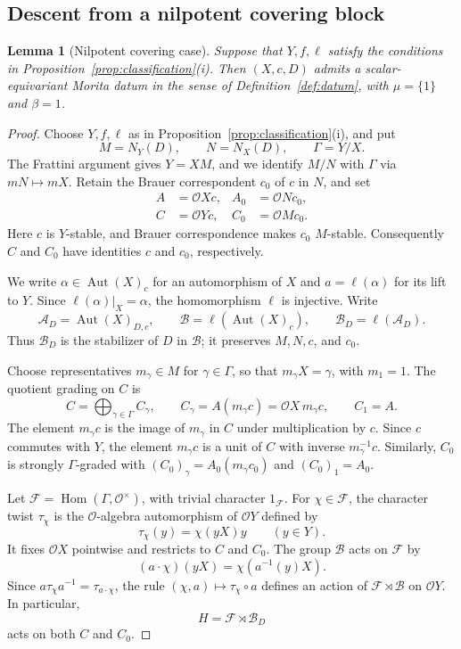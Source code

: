 \documentclass[11pt,a4paper]{article}
\newtheorem{lemma}[theorem]{Lemma}
\theoremstyle{definition}
\theoremstyle{remark}
\numberwithin{equation}{section}
\newcommand{\cO}{\mathcal{O}}
\DeclareMathOperator{\Aut}{Aut}
\DeclareMathOperator{\Hom}{Hom}
\begin{document}
	\subsection{Descent from a nilpotent covering block}
	
	\begin{lemma}[Nilpotent covering case]\label{lem:nilpotent-covering}
		Suppose that $Y,f,\ell$ satisfy the conditions in
		Proposition~\ref{prop:classification}\textup{(i)}.
		Then $(X,c,D)$ admits a scalar-equivariant Morita datum in the
		sense of Definition~\ref{def:datum}, with $\mu=\{1\}$ and $\beta=1$.
	\end{lemma}
	
	\begin{proof}
		Choose $Y,f,\ell$ as in Proposition~\ref{prop:classification}\textup{(i)},
		and put
		\[
		M=N_Y(D),\qquad N=N_X(D),\qquad \Gamma=Y/X.
		\]
		The Frattini argument gives $Y=XM$, and we identify $M/N$ with
		$\Gamma$ via $mN\mapsto mX$. Retain the Brauer correspondent
		$c_0$ of $c$ in $N$, and set
		\[
		\begin{aligned}
			A&=\cO Xc,& A_0&=\cO Nc_0,\\
			C&=\cO Yc,& C_0&=\cO Mc_0.
		\end{aligned}
		\]
		Here $c$ is $Y$-stable, and Brauer correspondence makes $c_0$
		$M$-stable. Consequently $C$ and $C_0$ have identities $c$ and
		$c_0$, respectively.
		
		We write $\alpha\in\Aut(X)_c$ for an automorphism of $X$ and
		$a=\ell(\alpha)$ for its lift to $Y$. Since $\ell(\alpha)|_X=\alpha$, the
		homomorphism $\ell$ is injective. Write
		\[
		\mathcal A_D=\Aut(X)_{D,c},\qquad
		\mathcal B=\ell(\Aut(X)_c),\qquad
		\mathcal B_D=\ell(\mathcal A_D).
		\]
		Thus $\mathcal B_D$ is the stabilizer of $D$ in $\mathcal B$;
		it preserves $M,N,c$, and $c_0$.
		
		Choose representatives $m_\gamma\in M$ for $\gamma\in\Gamma$,
		so that $m_\gamma X=\gamma$, with $m_1=1$.
		The quotient grading on $C$ is
		\[
		C=\bigoplus_{\gamma\in\Gamma}C_\gamma,\qquad
		C_\gamma=A(m_\gamma c)=\cO X\,m_\gamma c,\qquad C_1=A.
		\]
		The element $m_\gamma c$ is the image of $m_\gamma$ in $C$ under
		multiplication by $c$. Since $c$ commutes with $Y$, the element
		$m_\gamma c$ is a unit of $C$ with inverse $m_\gamma^{-1}c$.
		Similarly, $C_0$ is strongly $\Gamma$-graded with
		$(C_0)_\gamma=A_0(m_\gamma c_0)$ and $(C_0)_1=A_0$.
		
		Let $\mathcal F=\Hom(\Gamma,\cO^\times)$, with trivial character
		$1_{\mathcal F}$. For $\chi\in\mathcal F$,
		the character twist $\tau_\chi$ is the $\cO$-algebra automorphism
		of $\cO Y$ defined by
		\[
		\tau_\chi(y)=\chi(yX)y\qquad(y\in Y).
		\]
		It fixes $\cO X$ pointwise and restricts to $C$ and $C_0$.
		The group $\mathcal B$ acts on $\mathcal F$ by
		\[
		(a\cdot\chi)(yX)=\chi(a^{-1}(y)X).
		\]
		Since $a\tau_\chi a^{-1}=\tau_{a\cdot\chi}$, the rule
		$(\chi,a)\mapsto\tau_\chi\circ a$ defines an action of
		$\mathcal F\rtimes\mathcal B$ on $\cO Y$.
		In particular,
		\[
		H=\mathcal F\rtimes\mathcal B_D
		\]
		acts on both $C$ and $C_0$.
		

\end{proof}
\end{document}
